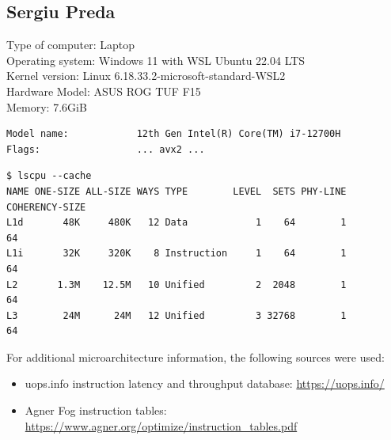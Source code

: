 \documentclass[a4paper,11pt]{article}
\begin{document}
\subsection{Sergiu Preda}

Type of computer: Laptop \\
Operating system: Windows 11 with WSL Ubuntu 22.04 LTS \\
Kernel version: Linux 6.18.33.2-microsoft-standard-WSL2 \\
Hardware Model: ASUS ROG TUF F15 \\
Memory: 7.6GiB

\begin{lstlisting}[caption=From lscpu]
Model name:            12th Gen Intel(R) Core(TM) i7-12700H
Flags:                 ... avx2 ...
\end{lstlisting}

\begin{lstlisting}[caption=From lscpu --cache]
$ lscpu --cache
NAME ONE-SIZE ALL-SIZE WAYS TYPE        LEVEL  SETS PHY-LINE COHERENCY-SIZE
L1d       48K     480K   12 Data            1    64        1             64
L1i       32K     320K    8 Instruction     1    64        1             64
L2       1.3M    12.5M   10 Unified         2  2048        1             64
L3        24M      24M   12 Unified         3 32768        1             64
\end{lstlisting}

For additional microarchitecture information, the following sources
were used:

\begin{itemize}
    \item uops.info instruction latency and throughput database: \url{https://uops.info/}
    \item Agner Fog instruction tables: \url{https://www.agner.org/optimize/instruction_tables.pdf}
\end{itemize}


\newpage
\appendix
\end{document}
